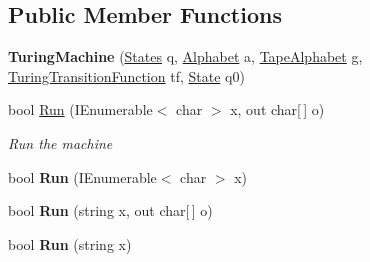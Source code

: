\subsection*{Public Member Functions}
\begin{DoxyCompactItemize}
\item 
\mbox{\label{class_system_1_1_automata_1_1_turing_machine_aaa0a99528675b0d136a68f9e0981d3fa}} 
{\bfseries Turing\+Machine} (\mbox{\hyperlink{class_system_1_1_automata_1_1_states}{States}} q, \mbox{\hyperlink{class_system_1_1_automata_1_1_alphabet}{Alphabet}} a, \mbox{\hyperlink{class_system_1_1_automata_1_1_tape_alphabet}{Tape\+Alphabet}} g, \mbox{\hyperlink{class_system_1_1_automata_1_1_turing_transition_function}{Turing\+Transition\+Function}} tf, \mbox{\hyperlink{class_system_1_1_automata_1_1_state}{State}} q0)
\item 
bool \mbox{\hyperlink{class_system_1_1_automata_1_1_turing_machine_a49d164f2e9784ad4ac23410c702ad1b0}{Run}} (I\+Enumerable$<$ char $>$ x, out char\mbox{[}$\,$\mbox{]} o)
\begin{DoxyCompactList}\small\item\em Run the machine \end{DoxyCompactList}\item 
\mbox{\label{class_system_1_1_automata_1_1_turing_machine_a4392d8174f54fb36a8c4ef86161ef6c8}} 
bool {\bfseries Run} (I\+Enumerable$<$ char $>$ x)
\item 
\mbox{\label{class_system_1_1_automata_1_1_turing_machine_a98e84b8b1e0e551cb07ff9408606196c}} 
bool {\bfseries Run} (string x, out char\mbox{[}$\,$\mbox{]} o)
\item 
\mbox{\label{class_system_1_1_automata_1_1_turing_machine_a765c176211ed3dd0381728b1c90ba36c}} 
bool {\bfseries Run} (string x)
\end{DoxyCompactItemize}
